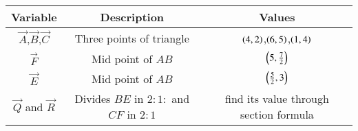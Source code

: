 \begin{tabular}[12pt]{ |c| c| c|}
    \hline
    \textbf{Variable} & \textbf{Description} & \textbf{Values} \\ 
    \hline
    $\vec{A}$,$\vec{B}$,$\vec{C}$ & Three points of triangle & $\left(4,2\right)$,$\left(6,5\right)$,$\left(1,4\right)$ \\
    \hline
    $\vec{F}$ &  Mid point of $AB$ & $\left(5,\frac{7}{2}\right)$ \\
    \hline 
    $\vec{E}$ &  Mid point of $AB$ & $\left(\frac{5}{2},3\right)$ \\
    \hline   
    $\vec{Q}$ and $\vec{R}$ & Divides $BE$ in $2:1:$ and $CF$ in $2:1$ & find its value through section formula  \\
    \hline
    \end{tabular}
